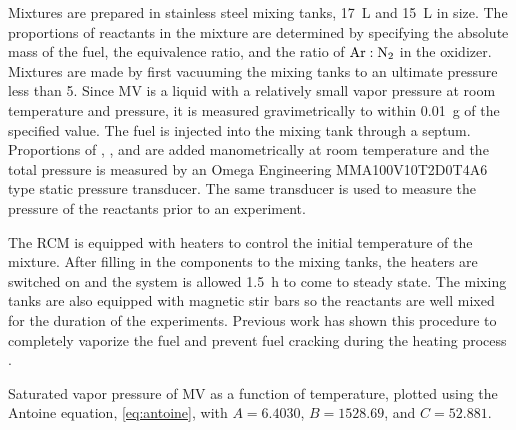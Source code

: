 \documentclass[letterpaper, review, sort&compress]{elsarticle}
\begin{document}
Mixtures are prepared in stainless steel mixing tanks, \SI{17}{\L} and \SI{15}{\L} in size. The
proportions of reactants in the mixture are determined by specifying the absolute mass of the fuel,
the equivalence ratio, and the ratio of \(\ce{Ar}:\ce{N2}\) in the oxidizer. Mixtures are
made by first vacuuming the mixing tanks to an ultimate pressure less than \SI{5}{\torr}. Since MV
is a liquid with a relatively small vapor pressure at room temperature and pressure, it is measured
gravimetrically to within \SI{0.01}{\g} of the specified value. The fuel is injected into the mixing
tank through a septum. Proportions of , , and  are added manometrically at room
temperature and the total pressure is measured by an Omega Engineering MMA100V10T2D0T4A6 type static
pressure transducer. The same transducer is used to measure the pressure of the reactants prior to
an experiment.

The RCM is equipped with heaters to control the initial temperature of the mixture. After filling in
the components to the mixing tanks, the heaters are switched on and the system is allowed
\SI{1.5}{\hour} to come to steady state. The mixing tanks are also equipped with magnetic stir bars
so the reactants are well mixed for the duration of the experiments. Previous work has shown this
procedure to completely vaporize the fuel and prevent fuel cracking during the heating process
\cite{Weber2011a,Kumar2009,Das2012}.

\begin{center}
    \captionsetup{type=figure}
    
    \caption{Saturated vapor pressure of MV as a function of temperature,
    plotted using the Antoine equation, \cref{eq:antoine}, with
    \(A=6.4030\), \(B=1528.69\), and \(C=52.881\).}
    \label{fig:vapor-pressure}
\end{center}
\end{document}
